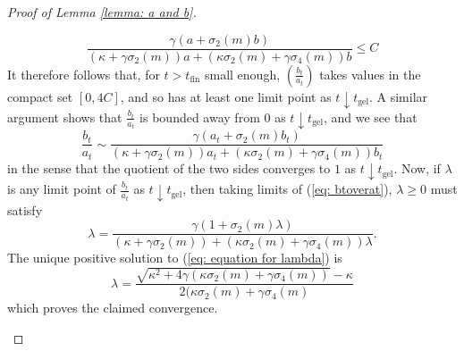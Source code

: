 \begin{proof}[Proof of Lemma \ref{lemma: a and b}]
\begin{enumerate}[label=\roman{*}).]
\begin{equation}
       \frac{\gamma( a+\sigma_2(m)b)}{(\kappa+\gamma \sigma_2(m))a+(\kappa \sigma_2(m)+\gamma\sigma_4(m))b}\le C
   \end{equation} It therefore follows that, for $t> t_\text{fin}$ small enough, $(\frac{b_t}{a_t})$ takes values in the compact set $[0,4C]$, and so has at least one limit point as $t\downarrow t_\text{gel}$. A similar argument shows that $\frac{b_t}{a_t}$ is bounded away from $0$ as $t\downarrow t_\text{gel}$, and we see that \begin{equation}\label{eq: btoverat}
        \frac{b_t}{a_t}\sim \frac{\gamma (a_t+\sigma_2(m)b_t)}{(\kappa+\gamma \sigma_2(m))a_t+(\kappa \sigma_2(m)+\gamma\sigma_4(m))b_t}
    \end{equation} in the sense that the quotient of the two sides converges to $1$ as $t\downarrow t_\text{gel}$. Now, if $\lambda$ is any limit point of $\frac{b_t}{a_t}$ as $t\downarrow t_\text{gel}$, then taking limits of (\ref{eq: btoverat}), $\lambda \ge 0$ must satisfy \begin{equation}\label{eq: equation for lambda}
        \lambda=\frac{\gamma(1 +\sigma_2(m)\lambda)}{(\kappa+\gamma \sigma_2(m))+(\kappa \sigma_2(m)+\gamma\sigma_4(m))\lambda}.
    \end{equation}The unique positive solution to (\ref{eq: equation for lambda}) is \begin{equation}
       \lambda=\frac{\sqrt{\kappa^2+4\gamma(\kappa\sigma_2(m)+\gamma \sigma_4(m))}-\kappa}{2(\kappa\sigma_2(m)+\gamma\sigma_4(m)}
    \end{equation} which proves the claimed convergence.
\end{enumerate}\end{proof}
